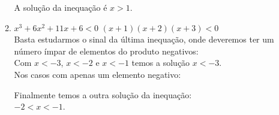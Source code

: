 \begin{enumerate}
\begin{enumerate}
			A solução da inequação é $x > 1$.
		\item  %
			$x^3 + 6x^2 + 11x + 6 < 0$
			$(x+1)(x+2)(x+3) < 0$
			\\
			Basta estudarmos o sinal da última inequação, onde deveremos ter um número ímpar de elementos do produto negativos:\\
			Com $x < -3$, $x < -2$ e $x < -1$ temos a solução $x < -3$.\\
			Nos casos com apenas um elemento negativo:
			Finalmente temos a outra solução da inequação:\\
			$-2 < x < -1$.


\end{enumerate}
\end{enumerate}
